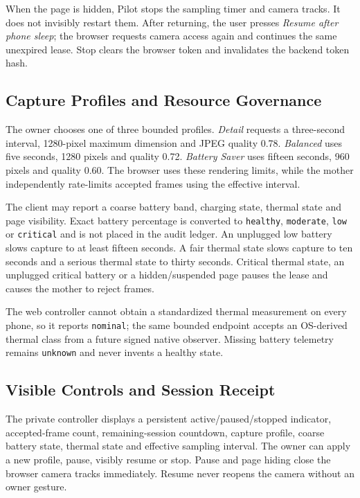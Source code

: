 When the page is hidden, Pilot stops the sampling timer and camera tracks.  It
does not invisibly restart them.  After returning, the user presses
\emph{Resume after phone sleep}; the browser requests camera access again and
continues the same unexpired lease.  Stop clears the browser token and invalidates
the backend token hash.

\subsection{Capture Profiles and Resource Governance}

The owner chooses one of three bounded profiles. \emph{Detail} requests a
three-second interval, 1280-pixel maximum dimension and JPEG quality 0.78.
\emph{Balanced} uses five seconds, 1280 pixels and quality 0.72.
\emph{Battery Saver} uses fifteen seconds, 960 pixels and quality 0.60. The
browser uses these rendering limits, while the mother independently rate-limits
accepted frames using the effective interval.

The client may report a coarse battery band, charging state, thermal state and
page visibility. Exact battery percentage is converted to
\texttt{healthy}, \texttt{moderate}, \texttt{low} or \texttt{critical} and is
not placed in the audit ledger. An unplugged low battery slows capture to at
least fifteen seconds. A fair thermal state slows capture to ten seconds and a
serious thermal state to thirty seconds. Critical thermal state, an unplugged
critical battery or a hidden/suspended page pauses the lease and causes the
mother to reject frames.

The web controller cannot obtain a standardized thermal measurement on every
phone, so it reports \texttt{nominal}; the same bounded endpoint accepts an
OS-derived thermal class from a future signed native observer. Missing battery
telemetry remains \texttt{unknown} and never invents a healthy state.

\subsection{Visible Controls and Session Receipt}

The private controller displays a persistent active/paused/stopped indicator,
accepted-frame count, remaining-session countdown, capture profile, coarse
battery state, thermal state and effective sampling interval. The owner can
apply a new profile, pause, visibly resume or stop. Pause and page hiding close
the browser camera tracks immediately. Resume never reopens the camera without
an owner gesture.

